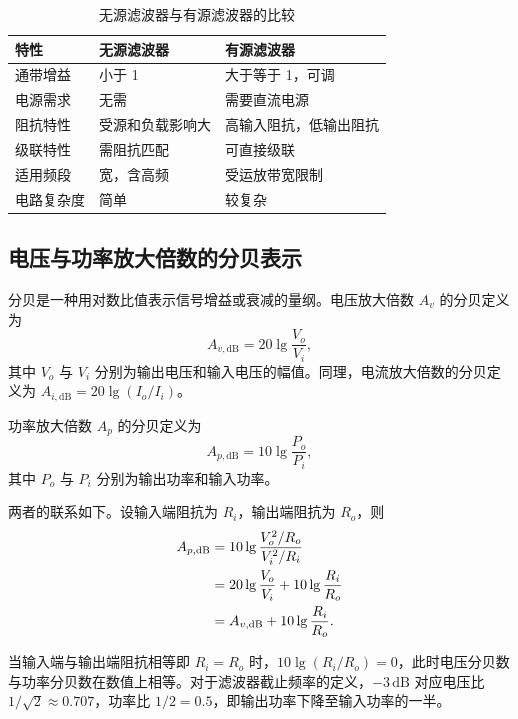 \documentclass[12pt]{ctexart}
\begin{document}
\begin{table}[H]
    \centering
    \caption{无源滤波器与有源滤波器的比较}
    \label{tab:filter-comparison}
    \begin{tabular}{lll}
        \toprule
        特性 & 无源滤波器 & 有源滤波器 \\
        \midrule
        通带增益   & 小于 1           & 大于等于 1，可调 \\
        电源需求   & 无需             & 需要直流电源 \\
        阻抗特性   & 受源和负载影响大 & 高输入阻抗，低输出阻抗 \\
        级联特性   & 需阻抗匹配       & 可直接级联 \\
        适用频段   & 宽，含高频       & 受运放带宽限制 \\
        电路复杂度 & 简单             & 较复杂 \\
        \bottomrule
    \end{tabular}
\end{table}

\subsection{电压与功率放大倍数的分贝表示}

分贝是一种用对数比值表示信号增益或衰减的量纲。电压放大倍数 $A_v$ 的分贝定义为
\begin{equation}
    A_{v,\mathrm{dB}} = 20\lg\frac{V_o}{V_i},
    \label{eq:av-db}
\end{equation}
其中 $V_o$ 与 $V_i$ 分别为输出电压和输入电压的幅值。同理，电流放大倍数的分贝定义为 $A_{i,\mathrm{dB}} = 20\lg(I_o / I_i)$。

功率放大倍数 $A_p$ 的分贝定义为
\begin{equation}
    A_{p,\mathrm{dB}} = 10\lg\frac{P_o}{P_i},
    \label{eq:ap-db}
\end{equation}
其中 $P_o$ 与 $P_i$ 分别为输出功率和输入功率。

两者的联系如下。设输入端阻抗为 $R_i$，输出端阻抗为 $R_o$，则
\begin{align}
    A_{p,\mathrm{dB}}
    &= 10\lg\frac{V_o^2 / R_o}{V_i^2 / R_i} \notag \\
    &= 20\lg\frac{V_o}{V_i} + 10\lg\frac{R_i}{R_o} \notag \\
    &= A_{v,\mathrm{dB}} + 10\lg\frac{R_i}{R_o}.
    \label{eq:av-ap-relation}
\end{align}

当输入端与输出端阻抗相等即 $R_i = R_o$ 时，$10\lg(R_i/R_o) = 0$，此时电压分贝数与功率分贝数在数值上相等。对于滤波器截止频率的定义，$-3\,\mathrm{dB}$ 对应电压比 $1/\sqrt{2} \approx 0.707$，功率比 $1/2 = 0.5$，即输出功率下降至输入功率的一半。
\end{document}
